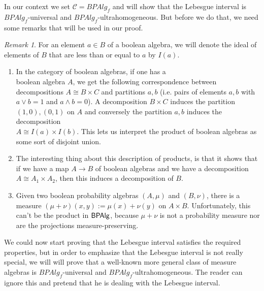 \documentclass[a4paper]{amsproc}
\theoremstyle{plain}
\theoremstyle{definition}
\theoremstyle{remark}
\newtheorem{remark}[theorem]{Remark}
\numberwithin{equation}{section}
\newcommand{\BPAlg}{\textup{\textsf{BPAlg}}}
\newcommand{\C}{\mathcal{C}}
\begin{document}
In our context we set $\C=BPAlg_f$ and will show that the Lebesgue interval is $BPAlg_f$-universal and $BPAlg_f$-ultrahomogeneous. But before we do that, we need some remarks that will be used in our proof.

\begin{remark}\label{partitions}
For an element $a \in B$ of a boolean algebra, we will denote the ideal of elements of $B$ that are less than or equal to $a$ by $I(a)$.
\begin{enumerate}
\item In the category of boolean algebras, if one has a \\ boolean algebra $A$, we get the following correspondence between decompositions $A \cong B \times C$ and partitions $a,b$ (i.e. pairs of elements $a,b$ with $a \vee b = 1$ and $a \wedge b = 0$). A decomposition $B \times C$ induces the partition $(1,0), (0,1)$ on $A$ and conversely the partition $a,b$ induces the decomposition \\ $A \cong I(a) \times I(b)$. This lets us interpret the product of boolean algebras as some sort of disjoint union.
\item The interesting thing about this description of products, is that it shows that if we have a map $A \to B$ of boolean algebras and we have a decomposition $A \cong A_1 \times A_2$, then this induces a decomposition of $B$.
\item Given two boolean probability algebras $(A, \mu)$ and $(B, \nu)$, there is a measure $(\mu + \nu)(x,y) := \mu(x) + \nu(y)$ on $A \times B$. Unfortunately, this can't be the product in $\BPAlg$, because $\mu + \nu$ is not a probability measure nor are the projections measure-preserving.
\end{enumerate}
\end{remark}

We could now start proving that the Lebesgue interval satisfies the required properties, but in order to emphasize that the Lebesgue interval is not really special, we will will prove that a well-known more general class of measure algebras is $BPAlg_f$-universal and $BPAlg_f$-ultrahomogeneous. The reader can ignore this and pretend that he is dealing with the Lebesgue interval.
\end{document}

